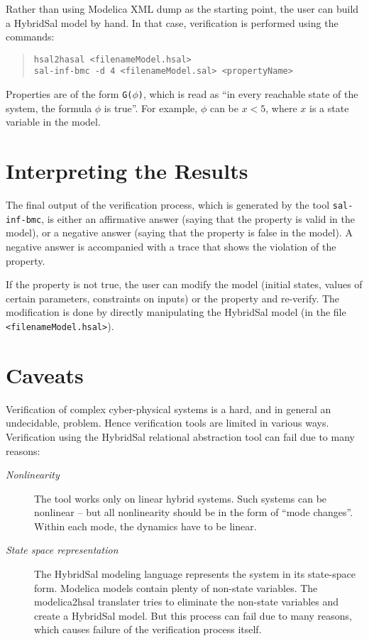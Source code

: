 \documentclass{article}
\begin{document}
Rather than using Modelica XML dump as the starting point, the user
can build a HybridSal model by hand.  In that case, verification is performed
using the commands:
\begin{quote}
 {\tt{hsal2hasal  <filenameModel.hsal>}}
\\
 {\tt{sal-inf-bmc -d 4 <filenameModel.sal> <propertyName>}}
\end{quote}

Properties are of the form {\tt{G($\phi$)}}, which is read as
``in every reachable state of the system, the formula $\phi$ is true''.
For example, $\phi$ can be $x < 5$, where $x$ is a state variable in 
the model.

\section{Interpreting the Results}

The final output of the verification process, which is generated by the tool
 {\tt{sal-inf-bmc}}, is either an affirmative answer (saying that the property
is valid in the model), or a negative answer (saying that the property is
false in the model).  A negative answer is accompanied with a trace that shows
the violation of the property.

If the property is not true, the user can modify the model 
(initial states, values of certain parameters, constraints on inputs)
or the property  and re-verify.  The modification is done by directly
manipulating the HybridSal model (in the file {\tt{<filenameModel.hsal>}}).




\section{Caveats}

Verification of complex cyber-physical systems is a hard,
and in general an undecidable, problem.  
Hence verification tools are limited in various ways.
Verification using the HybridSal relational abstraction tool
can fail due to many reasons:
\begin{description}
\item[{\em{Nonlinearity}}]
The tool works only on linear hybrid systems.  Such systems can be
nonlinear -- but all nonlinearity should be in the form of ``mode changes''.
Within each mode, the dynamics have to be linear.
\item[{\em{State space representation}}]
The HybridSal modeling language represents the system in its state-space
form.  Modelica models contain plenty of non-state variables.
The modelica2hsal translater tries to eliminate the non-state variables
and create a HybridSal model.  But this process can fail due to many 
reasons, which causes failure of the verification process itself.
\end{description}
\end{document}
